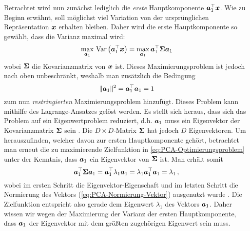 Betrachtet wird nun zunächst lediglich die \textit{erste} Hauptkomponente $\bm{a}_1^\top
	\bm{x}$. Wie zu Beginn erwähnt, soll möglichst viel Variation von der ursprünglichen
Repräsentation $\bm{x}$ erhalten bleiben. Daher wird die erste Hauptkomponente so gewählt, dass
die Varianz maximal wird:
\begin{equation}
	\label{eq:PCA-Optimierungsproblem}
	\max_{\bm{a}_1}\, \operatorname{Var} \left( \bm{a}_1^\top \bm{x} \right) = \max_{\bm{a}_1} \bm{a}_1^\top \mathbf{\Sigma} \bm{a}_1
\end{equation}
wobei $\mathbf{\Sigma}$ die Kovarianzmatrix von $\bm{x}$ ist. Dieses Maximierungsproblem ist jedoch nach oben unbeschränkt, weshalb man zusätzlich die Bedingung
\begin{equation}
	\label{eq:PCA-Normierung-Vektor}
	\lVert \bm{a}_1 \rVert^2 = \bm{a}_1^\top \bm{a}_1 = 1
\end{equation}
zum nun \textit{restringierten} Maximierungsproblem hinzufügt. Dieses Problem kann mithilfe des Lagrange-Ansatzes gelöst werden. Es stellt sich heraus, dass sich das Problem auf ein Eigenwertproblem reduziert, d.h. $\bm{a}_1$ muss ein Eigenvektor der Kovarianzmatrix $\mathbf{\Sigma}$ sein \parencite[vgl.][4 -- 6]{Jolliffe.2002}. Die $D \times D$-Matrix $\mathbf{\Sigma}$ hat jedoch $D$
Eigenvektoren. Um herauszufinden, welcher davon zur ersten Hauptkomponente gehört, betrachtet man
erneut die zu maximierende Zielfunktion in \eqref{eq:PCA-Optimierungsproblem} unter der Kenntnis,
dass $\bm{a}_1$ ein Eigenvektor von $\mathbf{\Sigma}$ ist. Man erhält somit
\begin{equation}
	\bm{a}_1^\top \mathbf{\Sigma} \bm{a}_1 = \bm{a}_1^\top \lambda_1 \bm{a}_1 = \lambda_1 \bm{a}_1^\top \bm{a}_1 = \lambda_1 \, ,
\end{equation}
wobei im ersten Schritt die Eigenvektor-Eigenschaft und im letzten Schritt die Normierung des Vektors (\eqref{eq:PCA-Normierung-Vektor}) ausgenutzt wurde \parencite[5]{Jolliffe.2002}. Die Zielfunktion entspricht also gerade dem Eigenwert $\lambda_1$ des
Vektors $\bm{a}_1$. Daher wissen wir wegen der Maximierung der Varianz der ersten
Hauptkomponente, dass $\bm{a}_1$ der Eigenvektor mit dem größten zugehörigen Eigenwert sein muss.

